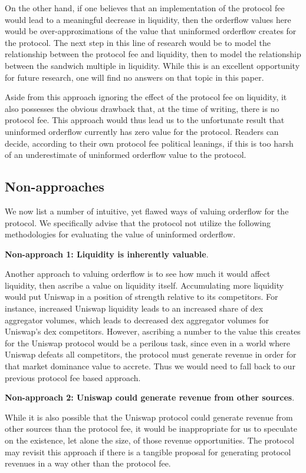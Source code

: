     On the other hand, if one believes that an implementation of the protocol fee would lead to a meaningful decrease in liquidity, then the orderflow values here would be over-approximations of the value that uninformed orderflow creates for the protocol. The next step in this line of research would be to model the relationship between the protocol fee and liquidity, then to model the relationship between the sandwich multiple in liquidity. While this is an excellent opportunity for future research, one will find no answers on that topic in this paper.

    Aside from this approach ignoring the effect of the protocol fee on liquidity, it also possesses the obvious drawback that, at the time of writing, there is no protocol fee. This approach would thus lead us to the unfortunate result that uninformed orderflow currently has zero value for the protocol. Readers can decide, according to their own protocol fee political leanings, if this is too harsh of an underestimate of uninformed orderflow value to the protocol.

\subsection{Non-approaches}
    We now list a number of intuitive, yet flawed ways of valuing orderflow for the protocol. We specifically advise that the protocol not utilize the following methodologies for evaluating the value of uninformed orderflow.

    \textbf{Non-approach 1: Liquidity is inherently valuable}.

    Another approach to valuing orderflow is to see how much it would affect liquidity, then ascribe a value on liquidity itself. Accumulating more liquidity would put Uniswap in a position of strength relative to its competitors. For instance, increased Uniswap liquidity leads to an increased share of dex aggregator volumes, which leads to decreased dex aggregator volumes for Uniswap's dex competitors. However, ascribing a number to the value this creates for the Uniswap protocol would be a perilous task, since even in a world where Uniswap defeats all competitors, the protocol must generate revenue in order for that market dominance value to accrete. Thus we would need to fall back to our previous protocol fee based approach.


    \textbf{Non-approach 2: Uniswap could generate revenue from other sources}.

    While it is also possible that the Uniswap protocol could generate revenue from other sources than the protocol fee, it would be inappropriate for us to speculate on the existence, let alone the size, of those revenue opportunities. The protocol may revisit this approach if there is a tangible proposal for generating protocol revenues in a way other than the protocol fee.


